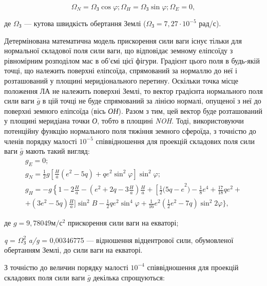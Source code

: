 \[\Omega_{N} =\Omega_{\text{З}}\cos \varphi;
\Omega_{H} =\Omega_{\text{З}}\sin \varphi; 
\Omega_{E} =0,\] 

\begin{ESKDexplanation}
 \item де  $\Omega_{\text{З}} $ --- кутова швидкість обертання Землі ($\Omega_{\text{З}}=7,27 \cdot 10^{-5}$ рад/с).
\end{ESKDexplanation}

Детермінована математична модель прискорення сили ваги існує тільки для нормальної 
складової поля сили ваги, що відповідає земному еліпсоїду з рівномірним розподілом 
мас в об'ємі цієї фігури. Градієнт цього поля в будь-якій точці, що належить поверхні 
еліпсоїда, спрямований за нормаллю до неї і розташований у площині меридіонального 
перетину. Оскільки точка місце положення ЛА не належить поверхні Землі, то вектор 
градієнта нормального поля сили ваги $\bar{g}$ в цій точці не буде спрямований за 
лінією нормалі, опущеної з неї до поверхні земного еліпсоїда (вісь \textit{ОН}). 
Разом з тим, цей вектор буде розташований у площині меридіана точки \textit{О}, тобто 
в площині \textit{NOH}. Тоді, використовуючи  потенційну функцію нормального поля 
тяжіння земного сфероїда, з точністю до членів порядку малості $10^{-5}$  співвідношення 
для проекцій складових поля сили ваги $\bar{g}$ мають такий вигляд:
\[\begin{array}{l} 
{g_{E} =0;} \\
{g_{N} =\frac{1}{2} g[\frac{H}{a} (e^{2} -5q)+qe^{2} \sin^{2}\varphi]\sin^2\varphi;}\\
{g_{H} =-g\left\{1-2\frac{H}{a} -\right. (e^{2} +2q-3\frac{H}{a})
\frac{H}{a} +\left[\frac{1}{2} (5q-e\right. ^{2} )-\frac{1}{8} e^{4} +\frac{17}{18}qe^{2} +} \\ 
{ +(3e^{2} - 5q)\frac{H}{a} ]\sin ^{2} B-\frac{1}{2} qe^{2} \sin ^{4} \varphi+\frac{1}{16} e^{2} 
(\frac{1}{2} e^{2} -7q)\sin ^{2} 2\varphi\},} 
\end{array}\]
\begin{ESKDexplanation}
\item де $g= 9,78049 \text{м}/\text{с}^{2}$ прискорення сили ваги на екваторі; 
\item \textit{q} = $\Omega_{\text{З}}^{2} $ \textit{a/g} = 0,00346775 --- відношення 
відцентрової сили, обумовленої обертанням Землі, до сили ваги на екваторі. 
\end{ESKDexplanation}

З точністю до величин порядку малості $10^{-4}$ співвідношення для проекцій складових 
поля сили ваги $\bar{g}$ декілька спрощуються:

